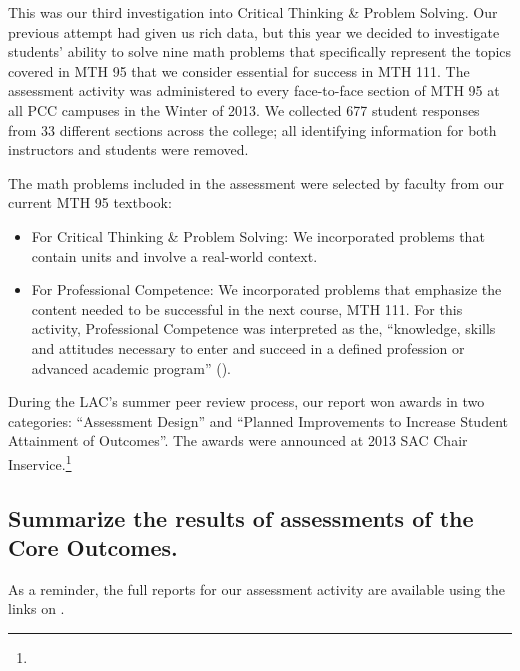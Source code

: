 \begin{description}
	This was our third investigation into Critical Thinking \& Problem Solving.  Our previous attempt had given
	us rich data, but this year we decided to investigate students' ability to solve
	nine math problems that specifically represent the topics covered in MTH 95 that
	we consider essential for success in MTH 111.  The assessment activity was
	administered to every face-to-face section of MTH 95 at all PCC campuses in the
	Winter of 2013.  We collected 677 student responses from 33 different sections
	across the college; all identifying information for both instructors and
	students were removed.

	The math problems included in the assessment were selected by faculty from our
	current MTH 95 textbook:
	\begin{itemize}
		\item For Critical Thinking \& Problem Solving: We incorporated problems that contain units and involve a
		real-world context.
		\item For Professional Competence:  We incorporated problems that emphasize the content needed to be
		successful in the next course, MTH 111.  For this activity, Professional
		Competence was interpreted as the, ``knowledge, skills and attitudes necessary
		to enter and succeed in a defined profession or advanced academic program''
		(\cite{coreoutcomes}).
	\end{itemize}
	During the LAC's summer peer review process, our report won awards in two
	categories: ``Assessment Design'' and ``Planned Improvements to Increase Student
	Attainment of Outcomes''.  The awards were announced at 2013 SAC Chair
	Inservice.\footnote{\awardsurl}
\end{description}

\subsection[Core Outcome assessment results]{Summarize the results of assessments of the Core Outcomes.}
As a reminder, the full reports for our assessment activity are available using
the links on .

